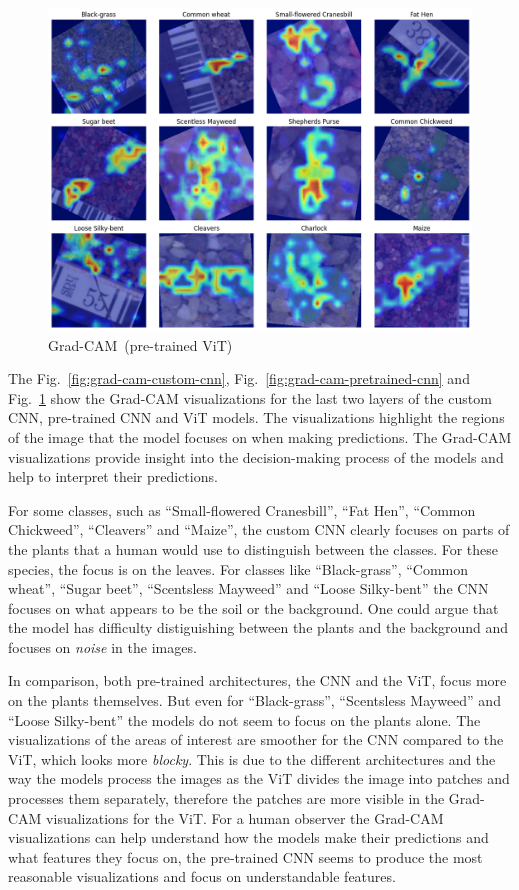 \begin{figure}[htbp]
    \centerline{\includegraphics[width=0.9\linewidth]{../../resources/vit/grad_cam.png}}
    \caption{Grad-CAM~(pre-trained ViT)}
    \label{fig:grad-cam-pretrained-vit}
\end{figure}

The Fig.~\ref{fig:grad-cam-custom-cnn}, Fig.~\ref{fig:grad-cam-pretrained-cnn} and Fig.~\ref{fig:grad-cam-pretrained-vit} show the Grad-CAM visualizations for the last two layers of the custom CNN, pre-trained CNN and ViT models. The visualizations highlight the regions of the image that the model focuses on when making predictions. The Grad-CAM visualizations provide insight into the decision-making process of the models and help to interpret their predictions.

For some classes, such as ``Small-flowered Cranesbill'', ``Fat Hen'', ``Common Chickweed'', ``Cleavers'' and ``Maize'', the custom CNN clearly focuses on parts of the plants that a human would use to distinguish between the classes. For these species, the focus is on the leaves. For classes like ``Black-grass'', ``Common wheat'', ``Sugar beet'', ``Scentsless Mayweed'' and ``Loose Silky-bent'' the CNN focuses on what appears to be the soil or the background. One could argue that the model has difficulty distiguishing between the plants and the background and focuses on \textit{noise} in the images.

In comparison, both pre-trained architectures, the CNN and the ViT, focus more on the plants themselves. But even for ``Black-grass'', ``Scentsless Mayweed'' and ``Loose Silky-bent'' the models do not seem to focus on the plants alone. The visualizations of the areas of interest are smoother for the CNN compared to the ViT, which looks more \textit{blocky}. This is due to the different architectures and the way the models process the images as the ViT divides the image into patches and processes them separately, therefore the patches are more visible in the Grad-CAM visualizations for the ViT. For a human observer the Grad-CAM visualizations can help understand how the models make their predictions and what features they focus on, the pre-trained CNN seems to produce the most reasonable visualizations and focus on understandable features.